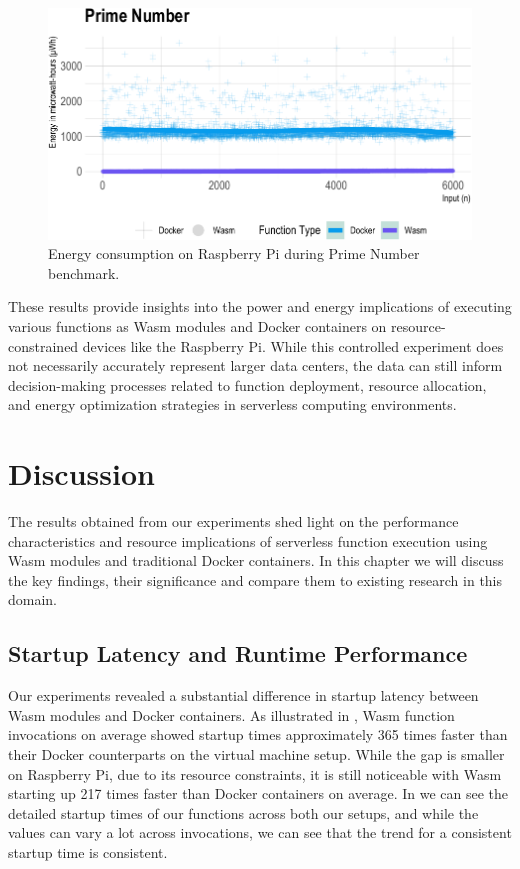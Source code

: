\documentclass[
  table]{report}
\begin{document}
\begin{figure}[H]

{\centering \includegraphics{thesis_files/figure-latex/prime-energy-1} 

}

\caption{Energy consumption on Raspberry Pi during Prime Number benchmark.}\label{fig:prime-energy}
\end{figure}

These results provide insights into the power and energy implications of
executing various functions as \ac{Wasm} modules and Docker containers
on resource-constrained devices like the Raspberry Pi. While this
controlled experiment does not necessarily accurately represent larger
data centers, the data can still inform decision-making processes
related to function deployment, resource allocation, and energy
optimization strategies in serverless computing environments.

\newpage
\chapter{Discussion}

The results obtained from our experiments shed light on the performance
characteristics and resource implications of serverless function
execution using \ac{Wasm} modules and traditional Docker containers. In
this chapter we will discuss the key findings, their significance and
compare them to existing research in this domain.

\section{Startup Latency and Runtime Performance}

Our experiments revealed a substantial difference in startup latency
between \ac{Wasm} modules and Docker containers. As illustrated in
, \ac{Wasm} function invocations on
average showed startup times approximately 365 times faster than their
Docker counterparts on the virtual machine setup. While the gap is
smaller on Raspberry Pi, due to its resource constraints, it is still
noticeable with \ac{Wasm} starting up 217 times faster than Docker
containers on average. In 
we can see the detailed startup times of our functions across both our
setups, and while the values can vary a lot across invocations, we can
see that the trend for a consistent startup time is consistent.
\end{document}
